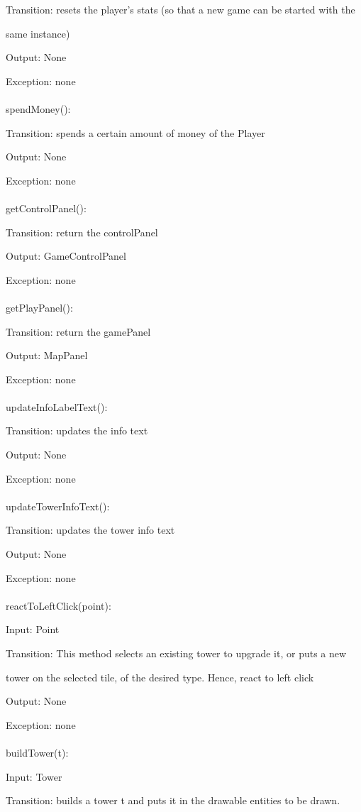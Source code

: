 \documentclass[12,english]{article}
\begin{document}
		Transition: resets the player's stats (so that a new game can be started with the
		
		same instance)
		
		Output: None
		
		Exception: none\\
		\\
		spendMoney():
		
		Transition: spends a certain amount of money of the Player
		
		Output: None
		
		Exception: none\\
		\\
		getControlPanel():
		
		Transition: return the controlPanel
		
		Output: GameControlPanel
		
		Exception: none\\
		\\
		getPlayPanel():
		
		Transition: return the gamePanel
		
		Output: MapPanel
		
		Exception: none\\
		\\
		updateInfoLabelText():
		
		Transition: updates the info text
		
		Output: None
		
		Exception: none\\
		\\
		updateTowerInfoText():
		
		Transition: updates the tower info text
		
		Output: None
		
		Exception: none\\
		\\
		reactToLeftClick(point):
		
		Input: Point
		
		Transition: This method selects an existing tower to upgrade it, or puts a new
		
		tower on the selected tile, of the desired type. Hence, react to left click
		
		Output: None
		
		Exception: none\\
		\\
		buildTower(t):
		
		Input: Tower
		
		Transition: builds a tower t and puts it in the drawable entities to be drawn.
		
\end{document}
